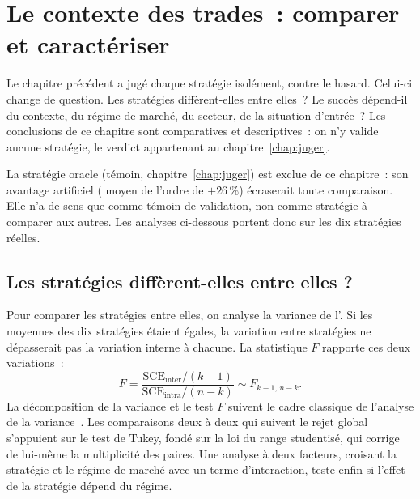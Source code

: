 \chapter{Le contexte des trades~: comparer et caractériser}
\label{chap:contexte}

Le chapitre précédent a jugé chaque stratégie isolément, contre le
hasard. Celui-ci change de question. Les stratégies diffèrent-elles
entre elles~? Le succès dépend-il du contexte, du régime de marché, du
secteur, de la situation d'entrée~? Les conclusions de ce chapitre sont
comparatives et descriptives~: on n'y valide aucune stratégie, le
verdict appartenant au chapitre~\ref{chap:juger}.

\begin{limites}
La stratégie oracle (témoin, chapitre~\ref{chap:juger}) est exclue de ce
chapitre~: son avantage artificiel (\edgevar{} moyen de l'ordre de
$+26\,\%$) écraserait toute comparaison. Elle n'a de sens que comme
témoin de validation, non comme stratégie à comparer aux autres. Les
analyses ci-dessous portent donc sur les dix stratégies réelles.
\end{limites}

\section{Les stratégies diffèrent-elles entre elles ?}
\label{sec:b1-etape2}

Pour comparer les stratégies entre elles, on analyse la variance de
l'\edgevar{}. Si les moyennes des dix stratégies étaient égales, la
variation entre stratégies ne dépasserait pas la variation interne à
chacune. La statistique \(F\) rapporte ces deux variations~:
\[
  F = \frac{\mathrm{SCE}_{\text{inter}}/(k-1)}
           {\mathrm{SCE}_{\text{intra}}/(n-k)} \sim F_{k-1,\,n-k}.
\]
La décomposition de la variance et le test \(F\) suivent le cadre
classique de l'analyse de la variance~\cite{scheffe1959}. Les
comparaisons deux à deux qui suivent le rejet global s'appuient sur le
test de Tukey, fondé sur la loi du range studentisé, qui corrige de
lui-même la multiplicité des paires. Une analyse à deux facteurs,
croisant la stratégie et le régime de marché avec un terme
d'interaction, teste enfin si l'effet de la stratégie dépend du régime.

